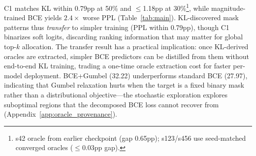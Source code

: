 \begin{table}[t]
\centering
\caption{Target-swap ablation (C1): BCE on KL-derived masks vs.\ KL predictor (same seed), TEAL uniform. All seeds show max $\Delta$$\leq$1.70pp at 30\%; max $\Delta$$\leq$0.79pp at 50\% (s42). $^\dagger$\textbf{Provenance:} s42 oracle extracted from an earlier training run (not seed-matched); s123/s456 use seed-matched retrained oracles (Appendix~\ref{app:oracle_provenance}).}
\label{tab:c1}
\end{table}

C1 matches KL within 0.79pp at 50\% and $\leq$1.18pp at 30\%\footnote{s42 oracle from earlier checkpoint (gap 0.65pp); s123/s456 use seed-matched converged oracles ($\leq$0.03pp gap).}, while magnitude-trained BCE yields $2.4\times$ worse PPL (Table~\ref{tab:main}).
KL-discovered mask patterns thus \emph{transfer} to simpler training (PPL within 0.79pp), though C1 binarizes soft logits, discarding ranking information that may matter for global top-$k$ allocation.
The transfer result has a practical implication: once KL-derived oracles are extracted, simpler BCE predictors can be distilled from them without end-to-end KL training, trading a one-time oracle extraction cost for faster per-model deployment.
BCE+Gumbel (32.22) underperforms standard BCE (27.97), indicating that Gumbel relaxation hurts when the target is a fixed binary mask rather than a distributional objective---the stochastic exploration explores suboptimal regions that the decomposed BCE loss cannot recover from (Appendix~\ref{app:oracle_provenance}). %

